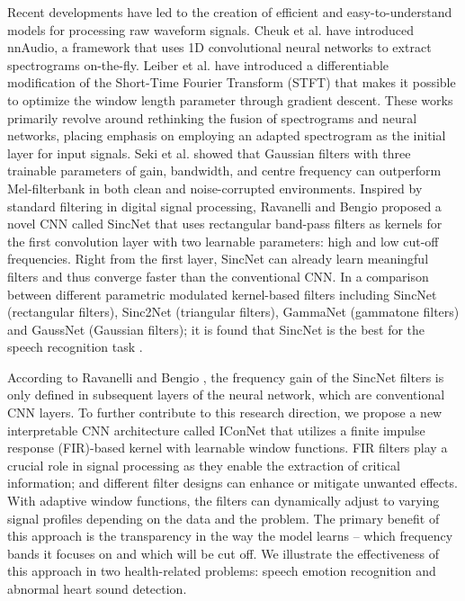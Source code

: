 Recent developments have led to the creation of efficient and easy-to-understand models for processing raw waveform signals. Cheuk et al. \cite{cheuk2020nnaudio} have introduced nnAudio, a framework that uses 1D convolutional neural networks to extract spectrograms on-the-fly. Leiber et al. \cite{leiber2022differentiable_stft_window} have introduced a differentiable modification of the Short-Time Fourier Transform (STFT) that makes it possible to optimize the window length parameter through gradient descent. These works primarily revolve around rethinking the fusion of spectrograms and neural networks, placing emphasis on employing an adapted spectrogram as the initial layer for input signals. Seki et al. \cite{seki2017deep} showed that Gaussian filters with three trainable parameters of gain, bandwidth, and centre frequency can outperform Mel-filterbank in both clean and noise-corrupted environments. Inspired by standard filtering in digital signal processing, Ravanelli and Bengio \cite{ravanelli2019interpretable} proposed a novel CNN called SincNet that uses rectangular band-pass filters as kernels for the first convolution layer with two learnable parameters: high and low cut-off frequencies. Right from the first layer, SincNet can already learn meaningful filters and thus converge faster than the conventional CNN. In a comparison between different parametric modulated kernel-based filters including SincNet (rectangular filters), Sinc2Net (triangular filters), GammaNet (gammatone filters) and GaussNet (Gaussian filters); it is found that SincNet is the best for the speech recognition task \cite{Loweimi2019}.

According to Ravanelli and Bengio \cite{ravanelli2019interpretable}, the frequency gain of the SincNet filters is only defined in subsequent layers of the neural network, which are conventional CNN layers. To further contribute to this research direction, we propose a new interpretable CNN architecture called IConNet that utilizes a finite impulse response (FIR)-based kernel with learnable window functions. FIR filters play a crucial role in signal processing as they enable the extraction of critical information; and different filter designs can enhance or mitigate unwanted effects. With adaptive window functions, the filters can dynamically adjust to varying signal profiles depending on the data and the problem. The primary benefit of this approach is the transparency in the way the model learns -- which frequency bands it focuses on and which will be cut off. We illustrate the effectiveness of this approach in two health-related problems: speech emotion recognition and abnormal heart sound detection.

